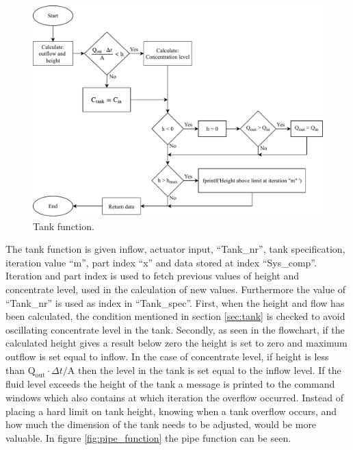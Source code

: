 \begin{figure}[H]
\centering
\includegraphics[width=0.95 \textwidth]{report/simulation/pictures/tank_function.pdf}
\caption{Tank function.}
\label{fig:tank_function}
\end{figure}

The tank function is given inflow, actuator input, ``Tank\_nr'', tank specification, iteration value ``m'', part index ``x'' and data stored at index ``Sys\_comp''. Iteration and part index is used to fetch previous values of height and concentrate level, used in the calculation of new values. Furthermore the value of ``Tank\_nr'' is used as index in ``Tank\_spec''.
First, when the height and flow has been calculated, the condition mentioned in section \ref{sec:tank} is checked to avoid oscillating concentrate level in the tank. %
Secondly, as seen in the flowchart, if the calculated height gives a result below zero the height is set to zero and maximum outflow is set equal to inflow. In the case of concentrate level, if height is less than $\text{Q}_\text{out} \cdot \Delta t / \text{A}$ then the level in the tank is set equal to the inflow level. If the fluid level exceeds the height of the tank a message is printed to the command windows which also contains at which iteration the overflow occurred. Instead of placing a hard limit on tank height, knowing when a tank overflow occurs, and how much the dimension of the tank needs to be adjusted, would be more valuable. 
In figure \ref{fig:pipe_function} the pipe function can be seen.

